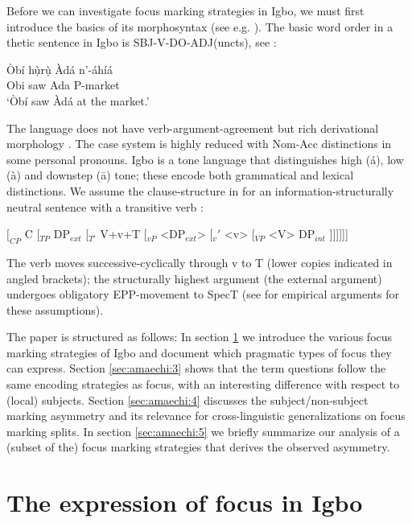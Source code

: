 \documentclass[output=paper,colorlinks,citecolor=brown]{langscibook}
\begin{document}
Before we can investigate focus marking strategies in Igbo, we must first introduce the basics of its morphosyntax (see e.g. \citealt{GreenIgwe1963, Carrel1970, Manfredi1991, Mbah2006, Emenanjo2015}). The basic word order in a thetic sentence in Igbo is SBJ-V-DO-ADJ(uncts), see :

\ea%
    \label{ex:amaechi:1}
    \gll    Òbí hụ̀rụ̀ Àdá n'-áhíá\\
            Obi saw Ada P-market\\
    \glt    `Òbí saw Àdá at the market.'
\z

The language does not have verb-argument-agreement but rich derivational morphology \citep{Uwalaka1988}. The case system is highly reduced with Nom-Acc distinctions in some personal pronouns. Igbo is a tone language that distinguishes high (\'a), low (\`a) and downstep (\=a) tone; these encode both grammatical and lexical distinctions. We assume the clause-structure in  for an information-structurally neutral sentence with a transitive verb \citep{AmaechiGeorgi2019}:

\ea%
    \label{ex:amaechi:2}
    $[_{CP}$ C [$_{TP}$ DP$_{ext}$ [$_{T'}$ V+v+T [$_{vP}$ <DP$_{ext}$> [$_v'$ <v> [$_{VP}$ <V> DP$_{int}$ ]]]]]]
\z

The verb moves successive-cyclically through v to T (lower copies indicated in angled brackets); the structurally highest argument (the external argument) undergoes obligatory EPP-movement to SpecT (see \citealt{AmaechiGeorgi2019} for empirical arguments for these assumptions).

The paper is structured as follows: In section \ref{sec:amaechi:2} we introduce the various focus marking strategies of Igbo and document which pragmatic types of focus they can express. Section \ref{sec:amaechi:3} shows that the term questions follow the same encoding strategies as focus, with an interesting difference with respect to (local) subjects. Section \ref{sec:amaechi:4} discusses the subject/non-subject marking asymmetry and its relevance for cross-linguistic generalizations on focus marking splits. In section \ref{sec:amaechi:5} we briefly summarize our analysis of a (subset of the) focus marking strategies that derives the observed asymmetry.

\section{The expression of focus in Igbo}\label{sec:amaechi:2}
\end{document}

